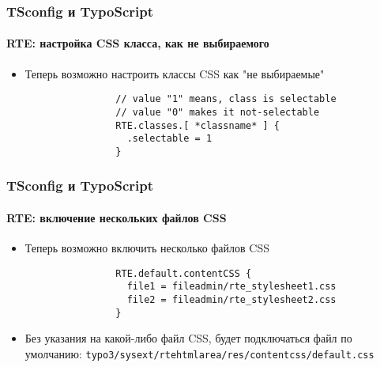 
\begin{frame}[fragile]
	\frametitle{TSconfig и TypoScript}
	\framesubtitle{RTE: настройка CSS класса, как не выбираемого}

	\begin{itemize}
		\item Теперь возможно настроить классы CSS как "не выбираемые"

			\begin{lstlisting}
				// value "1" means, class is selectable
				// value "0" makes it not-selectable
				RTE.classes.[ *classname* ] {
				  .selectable = 1
				}
			\end{lstlisting}

	\end{itemize}

\end{frame}


\begin{frame}[fragile]
	\frametitle{TSconfig и TypoScript}
	\framesubtitle{RTE: включение нескольких файлов CSS}

	\begin{itemize}
		\item Теперь возможно включить несколько файлов CSS

			\begin{lstlisting}
				RTE.default.contentCSS {
				  file1 = fileadmin/rte_stylesheet1.css
				  file2 = fileadmin/rte_stylesheet2.css
				}
			\end{lstlisting}

		\item Без указания на какой-либо файл CSS, будет подключаться файл по умолчанию:\newline
			\texttt{typo3/sysext/rtehtmlarea/res/contentcss/default.css}

	\end{itemize}

\end{frame}

